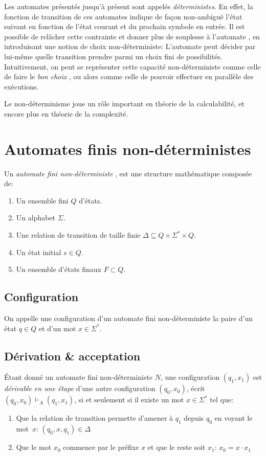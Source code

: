 Les automates présentés jusqu'à présent sont appelés \textit{déterministes}. En effet, la fonction de transition de ces automates indique de façon non-ambiguë l'état suivant en fonction de l'état courant et du prochain symbole en entrée.
Il est possible de relâcher cette contrainte et donner plus de souplesse à l'automate , en introduisant une notion de choix non-déterministe: L'automate peut décider par lui-même quelle transition prendre parmi un choix fini de possibilités.
Intuitivement, on peut se représenter cette capacité non-déterministe comme celle de faire le \og \textit{bon choix} \fg, ou alors comme celle de pouvoir effectuer en parallèle des exécutions.

Le non-déterminisme joue un rôle important en théorie de la calculabilité, et encore plus en théorie de la complexité.

\section{Automates finis non-déterministes}

Un \og \textit{automate fini non-déterministe} \fg{}, est une structure mathématique composée de:
\begin{enumerate}
\item Un ensemble fini $Q$ d'états.
\item Un alphabet $\Sigma$.
\item Une relation de transition de taille finie $\Delta \subseteq Q \times \Sigma^* \times Q$.
\item Un état initial $s \in Q$.
\item Un ensemble d'états finaux $F \subset Q$.
\end{enumerate}

\subsection{Configuration}

On appelle une \og configuration \fg{} d'un automate fini non-déterministe la paire d'un état $q \in Q$ et d'un mot $x \in \Sigma^*$.

\subsection{Dérivation \& acceptation}

Étant donné un automate fini non-déterministe $N$, une configuration $(q_1, x_1)$ est \og \textit{dérivable en une étape} \fg{} d'une autre configuration $(q_0, x_0)$, écrit $(q_0, x_0) \vdash_A (q_1, x_1)$, si et seulement si il existe un mot $x \in \Sigma^*$ tel que:
\begin{enumerate}
\item Que la relation de transition permette d'amener à $q_1$ depuis $q_0$ en voyant le mot~$x$: $(q_0, x, q_1) \in \Delta$
\item Que le mot $x_0$ commence par le préfixe $x$ et que le reste soit $x_1$: $x_0 = x \cdot x_1$
\end{enumerate}

